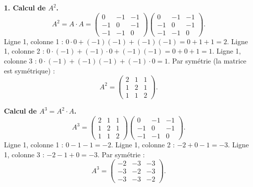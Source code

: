 \begin{solution}
	\textbf{1. Calcul de $A^2$.}
	\[
	A^2 = A\cdot A =
	\begin{pmatrix}0&-1&-1\\-1&0&-1\\-1&-1&0\end{pmatrix}
	\begin{pmatrix}0&-1&-1\\-1&0&-1\\-1&-1&0\end{pmatrix}.
	\]
	Ligne 1, colonne 1 : $0\cdot0+(-1)(-1)+(-1)(-1)=0+1+1=2$.
	Ligne 1, colonne 2 : $0\cdot(-1)+(-1)\cdot0+(-1)(-1)=0+0+1=1$.
	Ligne 1, colonne 3 : $0\cdot(-1)+(-1)(-1)+(-1)\cdot0=1$.
	Par symétrie (la matrice est symétrique) :
	\[
	A^2 = \begin{pmatrix}2&1&1\\1&2&1\\1&1&2\end{pmatrix}.
	\]
	
	\textbf{Calcul de $A^3 = A^2 \cdot A$.}
	\[
	A^3 =
	\begin{pmatrix}2&1&1\\1&2&1\\1&1&2\end{pmatrix}
	\begin{pmatrix}0&-1&-1\\-1&0&-1\\-1&-1&0\end{pmatrix}.
	\]
	Ligne 1, colonne 1 : $0-1-1=-2$. Ligne 1, colonne 2 : $-2+0-1=-3$.
	Ligne 1, colonne 3 : $-2-1+0=-3$. Par symétrie :
	\[
	A^3 = \begin{pmatrix}-2&-3&-3\\-3&-2&-3\\-3&-3&-2\end{pmatrix}.
	\]
	

\end{solution}
